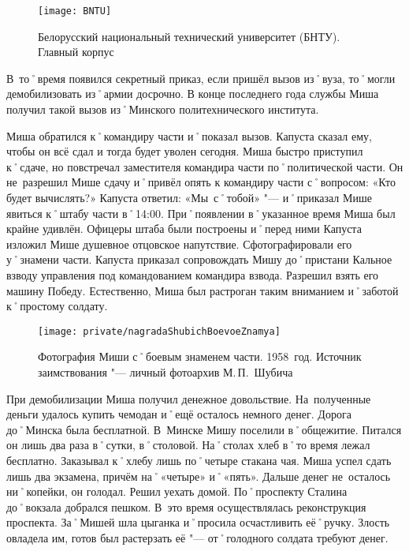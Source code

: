 \begin{wrapfigure}{O}{.4\textwidth}
\centering
\texttt{[image: BNTU]}
\caption[Белорусский национальный технический университет (БНТУ). Главный корпус]{Белорусский национальный технический университет (БНТУ). Главный корпус\footnotemark}
\label{fig:BNTU}
\end{wrapfigure}

В~то˚время появился секретный приказ, если пришёл вызов из˚вуза, то˚могли демобилизовать из˚армии досрочно. В конце последнего года службы Миша получил такой вызов из˚Минского политехнического института. 

Миша обратился к˚командиру части и˚показал вызов. Капуста сказал ему, чтобы он всё сдал и тогда будет уволен сегодня. Миша быстро приступил к˚сдаче, но повстречал заместителя командира части по˚политической части. Он не~разрешил Мише сдачу и˚привёл опять к командиру части с˚вопросом: «Кто будет вычислять?» Капуста ответил: «Мы~с˚тобой» "--- и˚приказал Мише явиться к˚штабу части в˚14:00. При˚появлении в˚указанное время Миша был крайне удивлён. Офицеры штаба были построены и˚перед ними Капуста изложил Мише душевное отцовское напутствие. Сфотографировали его у˚знамени части. Капуста приказал сопровождать Мишу до˚пристани Кальное взводу управления под командованием командира взвода. Разрешил взять его машину Победу. Естественно, Миша был растроган таким вниманием и˚заботой к˚простому солдату. 

\begin{figure}[h]
\texttt{[image: private/nagradaShubichBoevoeZnamya]}
\caption{Фотография Миши с˚боевым знаменем части. 1958~год. Источник заимствования "--- личный фотоархив М.\,П.~Шубича}
\label{fig:nagradaShubichBoevoeZnamya}
\end{figure}

При демобилизации Миша получил денежное довольствие. На~полученные деньги удалось купить чемодан и˚ещё осталось немного денег. Дорога до˚Минска была бесплатной. В~Минске Мишу поселили в˚общежитие. Питался он лишь два раза в˚сутки, в˚столовой. На˚столах хлеб в˚то время лежал бесплатно. Заказывал к˚хлебу лишь по˚четыре стакана чая. Миша успел сдать лишь два экзамена, причём на˚«четыре» и˚«пять». Дальше денег не~осталось ни˚копейки, он голодал. Решил уехать домой. По˚проспекту Сталина до˚вокзала добрался пешком. В~это время осуществлялась реконструкция проспекта. За˚Мишей шла цыганка и˚просила осчастливить её˚ручку. Злость овладела им, готов был растерзать её "--- от˚голодного солдата требуют денег.

